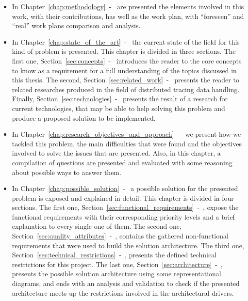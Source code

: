 \begin{itemize}
    \item In Chapter~\ref{chap:methodology}~-~ are presented the elements involved in this work, with their contributions, has well as the work plan, with ``foreseen'' and ``real'' work plans comparison and analysis.
    \item In Chapter~\ref{chap:state_of_the_art}~-~ the current state of the field for this kind of problem is presented. This chapter is divided in three sections. The first one, Section~\ref{sec:concepts}~-~ introduces the reader to the core concepts to know as a requirement for a full understanding of the topics discussed in this thesis. The second, Section~\ref{sec:related_work}~-~ presents the reader to related researches produced in the field of distributed tracing data handling. Finally, Section~\ref{sec:technologies}~-~ presents the result of a research for current technologies, that may be able to help solving this problem and produce a proposed solution to be implemented.
    \item In Chapter~\ref{chap:research_objectives_and_approach}~-~ we present how we tackled this problem, the main difficulties that were found and the objectives involved to solve the issues that are presented. Also, in this chapter, a compilation of questions are presented and evaluated with some reasoning about possible ways to answer them.
    \item In Chapter~\ref{chap:possible_solution}~-~ a possible solution for the presented problem is exposed and explained in detail. This chapter is divided in four sections. The first one, Section~\ref{sec:functional_requirements}~-~, expose the functional requirements with their corresponding priority levels and a brief explanation to every single one of them. The second one, Section~\ref{sec:quality_attributes}~-~, contains the gathered non-functional requirements that were used to build the solution architecture. The third one, Section~\ref{sec:technical_restrictions}~-~, presents the defined technical restrictions for this project. The last one, Section~\ref{sec:architecture}~-~, presents the possible solution architecture using some representational diagrams, and ends with an analysis and validation to check if the presented architecture meets up the restrictions involved in the architectural drivers.

\end{itemize}
